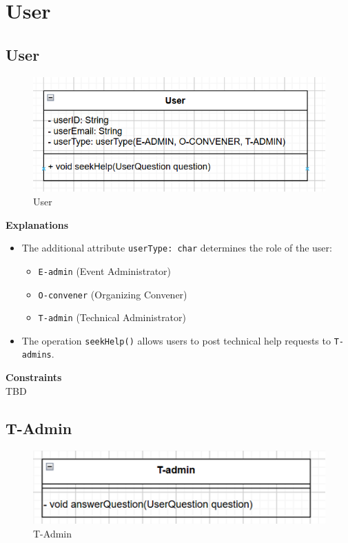 \section{User}

\subsection{User}

\begin{figure}[H]
    \centering
    \includegraphics[width=0.7\linewidth]{picture/3-2/3-2-1.png}
    \caption{User}
    \label{fig:enter-label}
\end{figure}

\textbf{Explanations}
\begin{itemize}
    \item The additional attribute \texttt{userType: char} determines the role of the user:
    \begin{itemize}
        \item \texttt{E-admin} (Event Administrator)
        \item \texttt{O-convener} (Organizing Convener)
        \item \texttt{T-admin} (Technical Administrator)
    \end{itemize}
    \item The operation \texttt{seekHelp()} allows users to post technical help requests to \texttt{T-admins}.
\end{itemize}

\textbf{Constraints} \\
TBD

\subsection{T-Admin}
\begin{figure}[H]
    \centering
    \includegraphics[width=0.7\linewidth]{picture/3-2/3-2-2.png}
    \caption{T-Admin}
    \label{fig:enter-label}
\end{figure}

